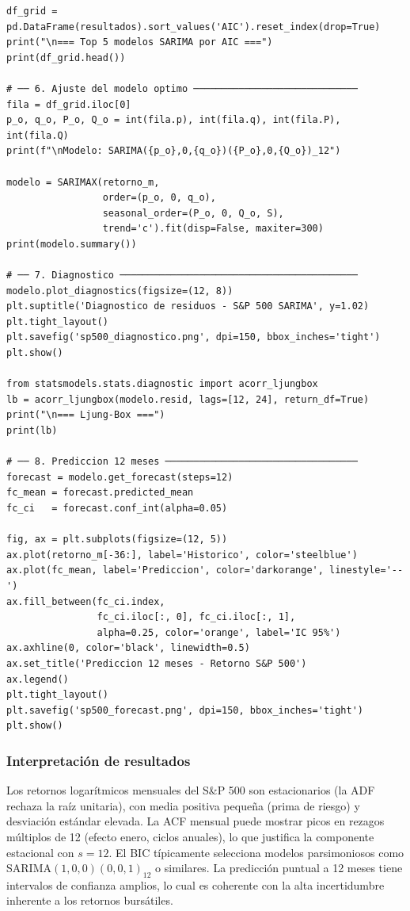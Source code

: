 \documentclass[12pt,a4paper]{article}
\begin{document}
\begin{lstlisting}[caption={Ejemplo 2: SARIMA para S\&P 500 mensual},label=lst:sp500]
df_grid = pd.DataFrame(resultados).sort_values('AIC').reset_index(drop=True)
print("\n=== Top 5 modelos SARIMA por AIC ===")
print(df_grid.head())

# ── 6. Ajuste del modelo optimo ─────────────────────────────
fila = df_grid.iloc[0]
p_o, q_o, P_o, Q_o = int(fila.p), int(fila.q), int(fila.P), int(fila.Q)
print(f"\nModelo: SARIMA({p_o},0,{q_o})({P_o},0,{Q_o})_12")

modelo = SARIMAX(retorno_m,
                 order=(p_o, 0, q_o),
                 seasonal_order=(P_o, 0, Q_o, S),
                 trend='c').fit(disp=False, maxiter=300)
print(modelo.summary())

# ── 7. Diagnostico ──────────────────────────────────────────
modelo.plot_diagnostics(figsize=(12, 8))
plt.suptitle('Diagnostico de residuos - S&P 500 SARIMA', y=1.02)
plt.tight_layout()
plt.savefig('sp500_diagnostico.png', dpi=150, bbox_inches='tight')
plt.show()

from statsmodels.stats.diagnostic import acorr_ljungbox
lb = acorr_ljungbox(modelo.resid, lags=[12, 24], return_df=True)
print("\n=== Ljung-Box ===")
print(lb)

# ── 8. Prediccion 12 meses ──────────────────────────────────
forecast = modelo.get_forecast(steps=12)
fc_mean = forecast.predicted_mean
fc_ci   = forecast.conf_int(alpha=0.05)

fig, ax = plt.subplots(figsize=(12, 5))
ax.plot(retorno_m[-36:], label='Historico', color='steelblue')
ax.plot(fc_mean, label='Prediccion', color='darkorange', linestyle='--')
ax.fill_between(fc_ci.index,
                fc_ci.iloc[:, 0], fc_ci.iloc[:, 1],
                alpha=0.25, color='orange', label='IC 95%')
ax.axhline(0, color='black', linewidth=0.5)
ax.set_title('Prediccion 12 meses - Retorno S&P 500')
ax.legend()
plt.tight_layout()
plt.savefig('sp500_forecast.png', dpi=150, bbox_inches='tight')
plt.show()
\end{lstlisting}

\subsubsection{Interpretación de resultados}

Los retornos logarítmicos mensuales del S\&P 500 son estacionarios (la ADF rechaza la raíz
unitaria), con media positiva pequeña (prima de riesgo) y desviación estándar elevada.
La ACF mensual puede mostrar picos en rezagos múltiplos de 12 (efecto enero, ciclos anuales),
lo que justifica la componente estacional con $s=12$. El BIC típicamente selecciona modelos
parsimoniosos como SARIMA$(1,0,0)(0,0,1)_{12}$ o similares. La predicción puntual a 12 meses
tiene intervalos de confianza amplios, lo cual es coherente con la alta incertidumbre inherente
a los retornos bursátiles.
\end{document}
